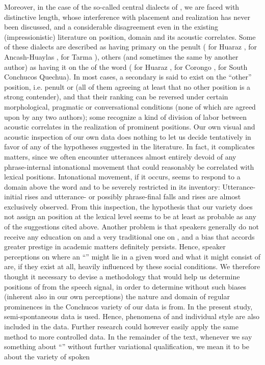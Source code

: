 \documentclass[output=paper]{LSP/langsci}
\begin{document}
Moreover, in the case of the so-called central dialects of , we are faced with distinctive length, whose interference with  placement and realization has never been discussed, and a considerable disagreement even in the existing (impressionistic) literature on  position, domain and its acoustic correlates. Some of these dialects are described as having primary  on the penult (\citealt{Trager1945} for Huaraz , \citealt{Parker1976} for Ancash-Huaylas , \citealt{Adelaar1977} for Tarma ), others (and sometimes the same by another author) as having it on the  of the word (\citealt{Parker1976} for Huaraz , \citealt{Hintz2000} for Corongo , \citealt{Hintz2006} for South Conchucos Quechua). In most cases, a secondary  is said to exist on the ``other'' position, i.e. penult or  (all of them agreeing at least that no other position is a strong contender), and that their  ranking can be reversed under certain morphological, pragmatic or conversational conditions (none of which are agreed upon by any two authors); some recognize a kind of division of labor between acoustic correlates in the realization of prominent positions. Our own visual and acoustic inspection of our own data does nothing to let us decide tentatively in favor of any of the hypotheses suggested in the literature. In fact, it complicates matters, since we often encounter utterances almost entirely devoid of any phrase-internal intonational movement that could reasonably be correlated with lexical  positions. Intonational movement, if it occurs, seems to respond to a domain above the word and to be severely restricted in its inventory: Utterance-initial rises and utterance- or possibly phrase-final falls and rises are almost exclusively observed. From this inspection, the hypothesis that our  variety does not assign an  position at the lexical level seems to be at least as probable as any of the suggestions cited above. Another problem is that speakers generally do not receive any education on  and a very traditional one on , and a bias that accords  greater prestige in academic matters definitely persists. Hence, speaker perceptions on where an “” might lie in a given  word and what it might consist of are, if they exist at all, heavily influenced by these social conditions. We therefore thought it necessary to devise a methodology that would help us determine positions of  from the speech signal, in order to determine without such biases (inherent also in our own perceptions) the nature and domain of regular prominences in the Conchucos variety of  our data is from. In the present study, semi-spontaneous data is used. Hence, phenomena of  and individual style are also included in the data. Further research could however easily apply the same method to more controlled data. In the remainder of the text, whenever we say something about “” without further variational qualification, we mean it to be about the variety of  spoken 
\end{document}
